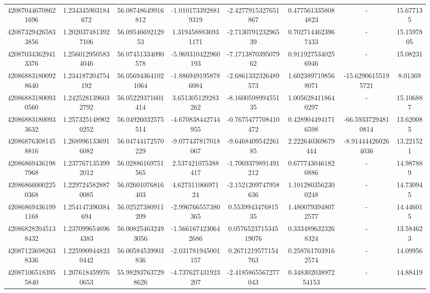 \documentclass{article}
\begin{document}
\begin{landscape}
\begin{longtable}[c]{S[table-format=18.0]S[table-format=2.15]S[table-format=2.15]S[table-format=-2.17]S[table-format=-2.16]S[table-format=-2.16]S[table-format=-3.16]S[table-format=2.7]}
420870446708621696 & 1.234345903184672  & 56.08748649916812  & -1.0101733928819319  & -2.4277915327651867    & 0.4775613358084823  & {-}                  & 15.677135  \\
420873294265833856 & 1.2020374813927106 & 56.0954669212953   & 1.3194588836931171   & -2.713079123296539     & 0.7027144623967433  & {-}                  & 15.1597805 \\
420870343629413376 & 1.2560129505834046 & 56.07451334090578  & -5.969310422960193   & -7.171387039507962     & 0.9119275340256946  & {-}                  & 15.08231   \\
420868831800928640 & 1.234187204754192  & 56.056943641021064 & -1.8869491958786084  & -2.6861332326489573    & 1.6023897198568071  & -15.62906155195721  & 8.01369    \\
420868831800930560 & 1.2425281396032792 & 56.05229371601414  & 3.651305129283262    & -8.160059899455135     & 1.0056284118640297  & {-}                  & 15.106887  \\
420868831800933632 & 1.2573251489020252 & 56.04926032575514  & -4.670838442744955   & -0.7675477708410472    & 0.4289044941716598  & -66.59337294810814  & 13.620085  \\
420868763081458816 & 1.2689961336916082 & 56.04744172570229  & -9.077437817018067   & -9.646840954226185     & 2.222640369679444   & -8.914444260264036  & 13.221521  \\
420868694361987968 & 1.2377671353992012 & 56.02886169751565  & 2.537421075388417    & -1.7069379891491212    & 0.6777430461820886  & {-}                  & 14.987889  \\
420868660002250368 & 1.2297245828870085 & 56.02601076816403  & 4.62731106697124     & -2.1521209747958636    & 1.1012803562300248  & {-}                  & 14.730945  \\
420868694361991168 & 1.254147390384694  & 56.02527380911209  & -2.996766557380365   & 0.553994347681535      & 1.4800793948072577  & {-}                  & 14.446015  \\
420868282045138432 & 1.2370996546964383 & 56.008254632493056 & -1.5661674230642686  & 0.057652371534519076   & 0.3334896323268324  & {-}                  & 13.584623  \\
420871236982638336 & 1.2259909448230442 & 56.00584539903836  & -2.031781945001157   & 0.2671219577154763     & 0.2587617039162574  & {-}                  & 14.09956   \\
420871065183955840 & 1.2076184599760653 & 55.982937637298626 & -4.737627431923207   & -2.4185865567277043    & 0.34830203897254153 & {-}                  & 14.88419   \\

\end{longtable}
\end{landscape}
\end{document}
